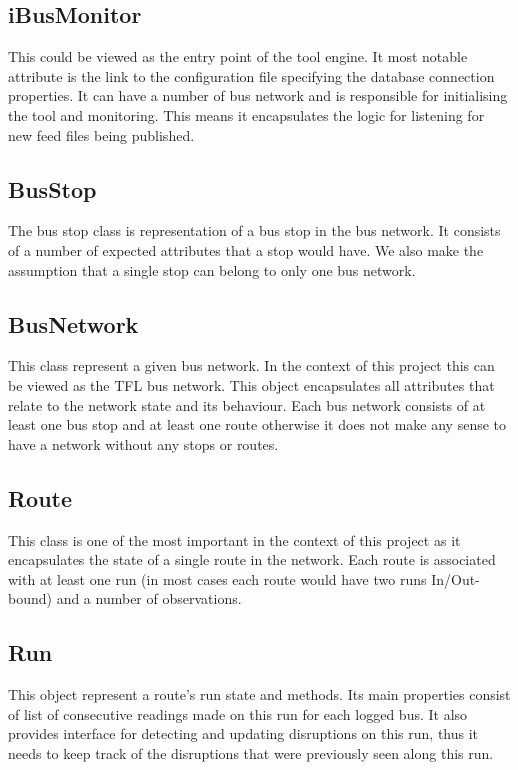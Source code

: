 \subsection{iBusMonitor}
This could be viewed as the entry point of the tool engine. It most notable attribute is the link to the configuration file specifying the database connection properties. It can have a number of bus network and is responsible for initialising the tool and monitoring. This means it encapsulates the logic for listening for new feed files being published.

\subsection{BusStop}
The bus stop class is representation of a bus stop in the bus network. It consists of a number of expected attributes that a stop would have. We also make the assumption that a single stop can belong to only one bus network.

\subsection{BusNetwork}
This class represent a given bus network. In the context of this project this can be viewed as the TFL bus network. This object encapsulates all attributes that relate to the network state and its behaviour. Each bus network consists of at least one bus stop and at least one route otherwise it does not make any sense to have a network without any stops or routes.

\subsection{Route}
This class is one of the most important in the context of this project as it encapsulates the state of a single route in the network. Each route is associated with at least one run (in most cases each route would have two runs In/Out-bound) and a number of observations. 

\subsection{Run}
This object represent a route's run state and methods. Its main properties consist of list of consecutive readings made on this run for each logged bus. It also provides interface for detecting and updating disruptions on this run, thus it needs to keep track of the disruptions that were previously seen along this run.

